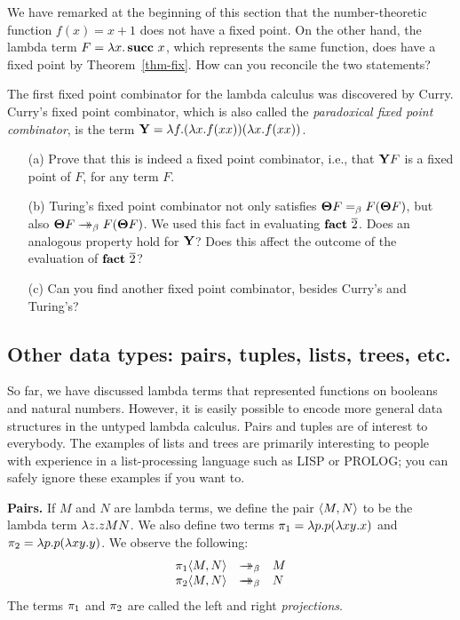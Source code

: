\documentclass{article}
\begin{document}
\begin{exercise}
  We have remarked at the beginning of this section that
  the number-theoretic function $f(x)=x+1$ does not have a
  fixed point. On the other hand, the lambda term $F=\lambda x.\mathop{\textbf{\bf succ}\,} x$,
  which represents the same function, does have a fixed point by
  Theorem~\ref{thm-fix}. How can you reconcile the two statements?
\end{exercise}

\begin{exercise}
  The first fixed point combinator for the lambda calculus was discovered
  by Curry.  Curry's fixed point combinator, which is also called the
  {\em paradoxical fixed point combinator}, is the term ${\bf Y}=\lambda f.(\lambda
  x.f(xx))(\lambda x.f(xx))$.
  \begin{enumerate}
  \item[(a)] Prove that this is indeed a fixed point combinator, i.e.,
    that ${\bf Y} F$ is a fixed point of $F$, for any term $F$. 
  \item[(b)] Turing's fixed point combinator not only satisfies $\textbf{\boldmath $\Theta$}
    F=_{\beta} F(\textbf{\boldmath $\Theta$} F)$, but also $\textbf{\boldmath $\Theta$} F\mathrel{\rightarrow\!\!\!\!\!\rightarrow}_{\beta} F(\textbf{\boldmath $\Theta$} F)$. We
    used this fact in evaluating $\mathop{\textbf{\bf fact}\,}\mathop{\overline{2}}$. Does an analogous
    property hold for ${\bf Y}$? Does this affect the outcome of the
    evaluation of $\mathop{\textbf{\bf fact}\,}\mathop{\overline{2}}$?
  \item[(c)] Can you find another fixed point combinator, besides Curry's
    and Turing's?
  \end{enumerate}
\end{exercise}

\subsection{Other data types: pairs, tuples, lists, trees, etc.}

So far, we have discussed lambda terms that represented functions on
booleans and natural numbers. However, it is easily possible to encode more
general data structures in the untyped lambda calculus. Pairs and
tuples are of interest to everybody. The examples of lists and trees
are primarily interesting to people with experience in a
list-processing language such as LISP or PROLOG; you can safely ignore
these examples if you want to.

{\bf Pairs.} If $M$ and $N$ are lambda terms, we define the pair
$\langle M,N\rangle$ to be the lambda term $\lambda z.zMN$. We also define two
terms $\pi_1=\lambda p.p(\lambda xy.x)$ and $\pi_2=\lambda p.p(\lambda xy.y)$.
We observe the following:
\[  \begin{array}{rcl}
  \leftt \pair{M,N} &\redbs& M \\
  \rightt \pair{M,N} &\redbs& N
\end{array}
\]
The terms $\pi_1$ and $\pi_2$ are called the left and right {\em
  projections}.
\end{document}
